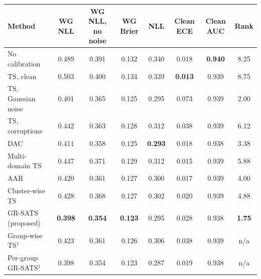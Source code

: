 \begin{tabular}{@{}lccccccc@{}}
\toprule
\textbf{Method} & \textbf{WG NLL} & \textbf{WG NLL, no noise} & \textbf{WG Brier} & \textbf{NLL} & \textbf{Clean ECE} & \textbf{Clean AUC} & \textbf{Rank} \\
\midrule
No calibration & 0.489 & 0.391 & 0.132 & 0.340 & 0.018 & \textbf{0.940} & 8.25 \\
TS, clean & 0.503 & 0.400 & 0.134 & 0.339 & \textbf{0.013} & 0.939 & 8.75 \\
TS, Gaussian noise & 0.401 & 0.365 & 0.125 & 0.295 & 0.073 & 0.939 & 2.00 \\
TS, corruptions & 0.442 & 0.363 & 0.128 & 0.312 & 0.038 & 0.939 & 6.12 \\
DAC & 0.411 & 0.358 & 0.125 & \textbf{0.293} & 0.018 & 0.938 & 3.38 \\
Multi-domain TS & 0.447 & 0.371 & 0.129 & 0.312 & 0.015 & 0.939 & 5.88 \\
AAR & 0.420 & 0.361 & 0.127 & 0.300 & 0.017 & 0.939 & 4.00 \\
Cluster-wise TS & 0.428 & 0.368 & 0.127 & 0.302 & 0.020 & 0.939 & 4.88 \\
GR-SATS (proposed) & \textbf{0.398} & \textbf{0.354} & \textbf{0.123} & 0.295 & 0.028 & 0.938 & \textbf{1.75} \\
\midrule
Group-wise TS$^\dagger$ & 0.423 & 0.361 & 0.126 & 0.306 & 0.038 & 0.939 & n/a \\
Per-group GR-SATS$^\dagger$ & 0.398 & 0.354 & 0.123 & 0.287 & 0.019 & 0.938 & n/a \\
\bottomrule
\end{tabular}
